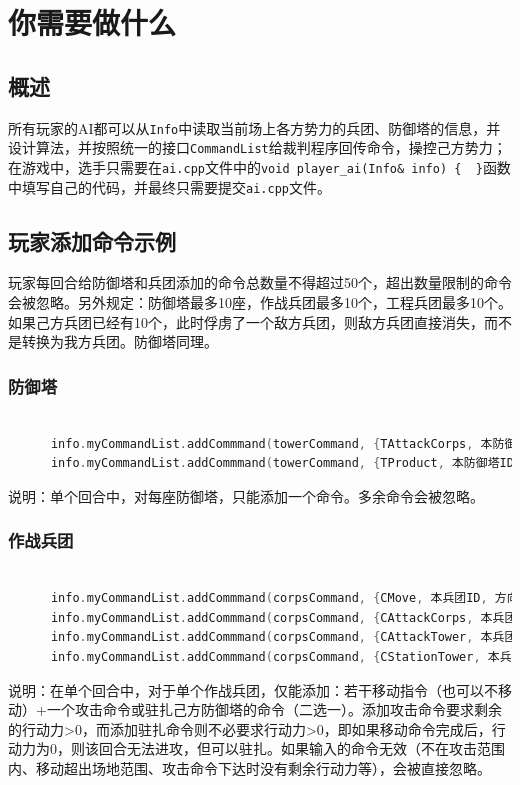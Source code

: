 \documentclass[a4paper,4pt]{article}
\begin{document}
\section{你需要做什么}
\subsection{概述}
所有玩家的AI都可以从\texttt{Info}中读取当前场上各方势力的兵团、防御塔的信息，并设计算法，并按照统一的接口\texttt{CommandList}给裁判程序回传命令，操控己方势力；在游戏中，选手只需要在\texttt{ai.cpp}文件中的\texttt{void player\_ai(Info\& info) \{ \   \}}函数中填写自己的代码，并最终只需要提交\texttt{ai.cpp}文件。

\subsection{玩家添加命令示例}
玩家每回合给防御塔和兵团添加的命令总数量不得超过50个，超出数量限制的命令会被忽略。另外规定：防御塔最多10座，作战兵团最多10个，工程兵团最多10个。如果己方兵团已经有10个，此时俘虏了一个敌方兵团，则敌方兵团直接消失，而不是转换为我方兵团。防御塔同理。
\subsubsection{防御塔}
\begin{lstlisting}[language={C++}]  %插入代码块
      
      info.myCommandList.addCommmand(towerCommand, {TAttackCorps, 本防御塔ID, 目标兵团ID})  //防御塔攻击兵团
      info.myCommandList.addCommmand(towerCommand, {TProduct, 本防御塔ID, 生产任务类型(见下方枚举类型)})  //防御塔设定生产任务
\end{lstlisting}
说明：单个回合中，对每座防御塔，只能添加一个命令。多余命令会被忽略。

\subsubsection{作战兵团}
\begin{lstlisting}[language={C++}]  %插入代码块
      
      info.myCommandList.addCommmand(corpsCommand, {CMove, 本兵团ID, 方向(Cup / Cdown / Cleft / Cright)})  //移动
      info.myCommandList.addCommmand(corpsCommand, {CAttackCorps, 本兵团ID, 目标兵团ID})  //兵团攻击兵团
      info.myCommandList.addCommmand(corpsCommand, {CAttackTower, 本兵团ID, 目标防御塔ID})  //兵团攻击防御塔
      info.myCommandList.addCommmand(corpsCommand, {CStationTower, 本兵团ID })  //兵团驻扎在己方防御塔
\end{lstlisting}
说明：在单个回合中，对于单个作战兵团，仅能添加：若干移动指令（也可以不移动）+一个攻击命令或驻扎己方防御塔的命令（二选一）。添加攻击命令要求剩余的行动力>0，而添加驻扎命令则不必要求行动力>0，即如果移动命令完成后，行动力为0，则该回合无法进攻，但可以驻扎。如果输入的命令无效（不在攻击范围内、移动超出场地范围、攻击命令下达时没有剩余行动力等），会被直接忽略。
\end{document}
